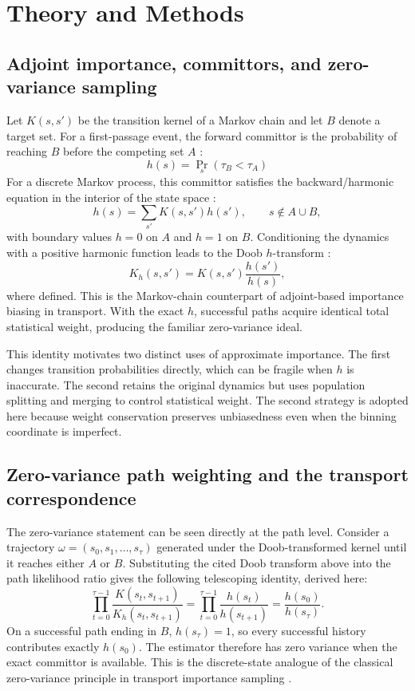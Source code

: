 \documentclass[a4paper,fleqn]{cas-sc}
\begin{document}
\section{Theory and Methods}
\subsection{Adjoint importance, committors, and zero-variance sampling}
Let $K(s,s')$ be the transition kernel of a Markov chain and let $B$ denote a target set. For a first-passage event, the forward committor is the probability of reaching $B$ before the competing set $A$ \citep{e2006,metzner2009}:
\begin{equation}
 h(s)=\Pr_s(\tau_B<\tau_A)
\end{equation}
For a discrete Markov process, this committor satisfies the backward/harmonic equation in the interior of the state space \citep{metzner2009}:
\begin{equation}
 h(s)=\sum_{s'}K(s,s')h(s'), \qquad s\notin A\cup B,
\end{equation}
with boundary values $h=0$ on $A$ and $h=1$ on $B$. Conditioning the dynamics with a positive harmonic function leads to the Doob $h$-transform \citep{chetrite2015}:
\begin{equation}
 K_h(s,s')=K(s,s')\frac{h(s')}{h(s)},
\end{equation}
where defined. This is the Markov-chain counterpart of adjoint-based importance biasing in transport. With the exact $h$, successful paths acquire identical total statistical weight, producing the familiar zero-variance ideal.

This identity motivates two distinct uses of approximate importance. The first changes transition probabilities directly, which can be fragile when $h$ is inaccurate. The second retains the original dynamics but uses population splitting and merging to control statistical weight. The second strategy is adopted here because weight conservation preserves unbiasedness even when the binning coordinate is imperfect.

\subsection{Zero-variance path weighting and the transport correspondence}\label{sec:zerovar}
The zero-variance statement can be seen directly at the path level. Consider a trajectory $\omega=(s_0,s_1,\ldots,s_\tau)$ generated under the Doob-transformed kernel until it reaches either $A$ or $B$. Substituting the cited Doob transform above into the path likelihood ratio gives the following telescoping identity, derived here:
\begin{equation}
 \prod_{t=0}^{\tau-1}\frac{K(s_t,s_{t+1})}{K_h(s_t,s_{t+1})}
 =\prod_{t=0}^{\tau-1}\frac{h(s_t)}{h(s_{t+1})}
 =\frac{h(s_0)}{h(s_\tau)}.
\end{equation}
On a successful path ending in $B$, $h(s_\tau)=1$, so every successful history contributes exactly $h(s_0)$. The estimator therefore has zero variance when the exact committor is available. This is the discrete-state analogue of the classical zero-variance principle in transport importance sampling \citep{lewins1965,spanier1969,haghighat2003}.
\end{document}
